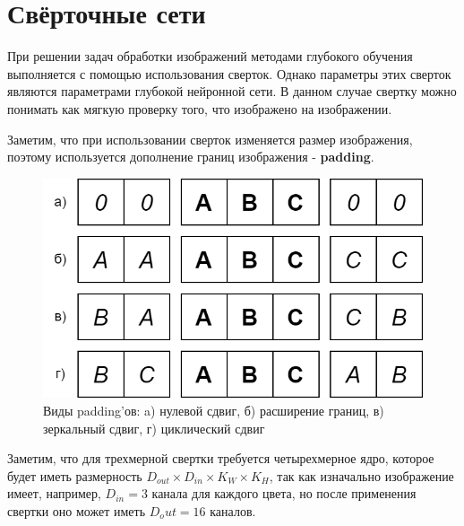 \section{Свёрточные сети}

При решении задач обработки изображений методами глубокого обучения выполняется с помощью использования сверток. Однако параметры этих сверток являются параметрами глубокой нейронной сети. В данном случае свертку можно понимать как мягкую проверку того, что изображено на изображении.

\begin{remark}
    Заметим, что при использовании сверток изменяется размер изображения, поэтому используется дополнение границ изображения - \textbf{padding}.
\end{remark}

\begin{figure}[htb]
    \centering
    \includegraphics[scale=0.3]{images/paddings.png}
    \caption{Виды padding'ов: a) нулевой сдвиг, б) расширение границ, в) зеркальный сдвиг, г) циклический сдвиг}
\end{figure}

Заметим, что для трехмерной свертки требуется четырехмерное ядро, которое будет иметь размерность $D_{out}\times D_{in}\times K_W\times K_H$, так как изначально изображение имеет, например, $D_{in}=3$ канала для каждого цвета, но после применения свертки оно может иметь $D_out=16$ каналов.

